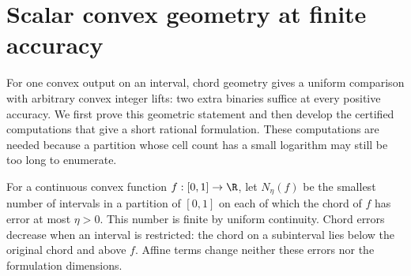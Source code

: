 \section{Scalar convex geometry at finite accuracy}\label{sec:scalar-geometry}

For one convex output on an interval, chord geometry gives a uniform
comparison with arbitrary convex integer lifts: two extra binaries
suffice at every positive accuracy. We first prove this geometric
statement and then develop the certified computations that give a short
rational formulation. These computations are needed because a partition
whose cell count has a small logarithm may still be too long to
enumerate.

For a continuous convex function $f:[0,1]\to\R$, let
$N_\eta(f)$ be the smallest number of intervals in a partition of
$[0,1]$ on each of which the chord of $f$ has error at most $\eta>0$.
This number is finite by uniform continuity. Chord errors decrease when
an interval is restricted: the chord on a subinterval lies below the
original chord and above $f$. Affine terms change neither these errors
nor the formulation dimensions.

